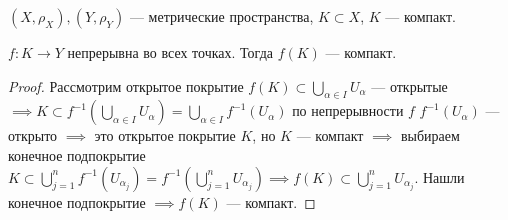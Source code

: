 \begin{theorem}
    $(X, \rho_X), (Y, \rho_Y)$ --- метрические пространства, $K \subset X$,  $K$ --- компакт.

    $f\!: K \to Y$ непрерывна во всех точках. Тогда  $f(K)$ --- компакт.
\end{theorem}
\begin{proof}
    Рассмотрим открытое покрытие $f(K) \subset \bigcup\limits_{\alpha \in I} U_\alpha$ --- открытые $\implies K \subset f^{-1}(\bigcup\limits_{\alpha \in I} U_\alpha) = \bigcup\limits_{\alpha \in I} f^{-1}(U_\alpha)$ по непрерывности $f$  $f^{-1}(U_\alpha)$ --- открыто  $\implies$ это открытое покрытие  $K$, но  $K$ --- компакт  $\implies$ выбираем конечное подпокрытие  $K \subset \bigcup\limits_{j=1}^n f^{-1}(U_{\alpha_j}) = f^{-1}(\bigcup\limits_{j=1}^n U_{\alpha_j}) \implies f(K) \subset \bigcup\limits_{j=1}^n U_{\alpha_j}$. Нашли конечное подпокрытие  $\implies f(K)$ --- компакт.
\end{proof}

